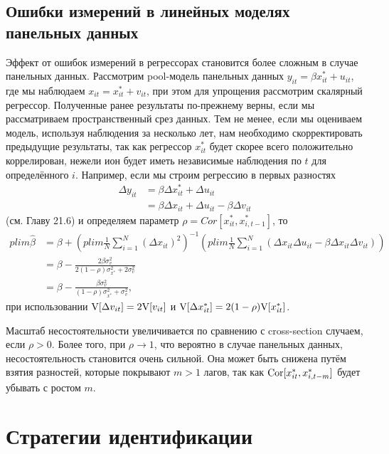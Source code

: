 \subsection{Ошибки измерений в линейных моделях панельных данных}
 
Эффект от ошибок измерений в регрессорах становится более сложным в случае панельных данных.
Рассмотрим pool-модель панельных данных $y_{it}=\beta x^*_{it}+u_{it}$, где мы наблюдаем $x_{it}=x^*_{it}+v_{it}$, при этом для упрощения рассмотрим скалярный регрессор. Полученные ранее результаты по-прежнему верны, если мы рассматриваем пространственный срез данных. Тем не менее, если мы оцениваем модель, используя наблюдения за несколько лет, нам необходимо скорректировать  предыдущие результаты, так как регрессор $x^*_{it}$ будет скорее всего положительно коррелирован, нежели ион будет иметь независимые наблюдения по $t$ для определённого $i$. Например, если мы строим регрессию в первых разностях
\begin{align*}
\Delta y_{it}&=\beta \Delta x^*_{it}+ \Delta u_{it} \\
&= \beta \Delta x_{it}+\Delta u_{it}-\beta \Delta v_{it}
\end{align*}
(см. Главу 21.6) и определяем параметр $\rho = Cor[x^*_{it}, x^*_{i,t-1}]$, то
\begin{align*}
plim\widehat{\beta}&=\beta + \left( plim \frac{1}{N} \sum \limits^{N}_{i=1}(\Delta x_{it})^2 \right)^{-1} \left( plim \frac{1}{N} \sum \limits^{N}_{i=1}(\Delta x_{it} \Delta u_{it}-\beta \Delta x_{it} \Delta v_{it}) \right) \\
&= \beta - \frac{2\beta \sigma^2_v}{2(1-\rho)\sigma^2_{x^*}+2\sigma^2_v} \\
&=\beta-\frac{\beta \sigma^2_v}{(1-\rho)\sigma^2_{x^*}+\sigma^2_v},
\end{align*}
при использовании $\mathrm{V}[\Delta v_{it}]=2\mathrm{V}[v_{it}]$ и $\mathrm{V}[\Delta x^*_{it}]=2(1-\rho)\mathrm{V}[x^*_{it}]$.

Масштаб несостоятельности увеличивается по сравнению с cross-section случаем, если $\rho>0$. Более того, при $\rho\rightarrow 1$, что вероятно в случае панельных данных, несостоятельность становится очень сильной. Она может быть снижена путём взятия разностей, которые покрывают $m>1$ лагов, так как $\mathrm{Cor}[x^*_{it}, x^*_{i,t-m}]$ будет убывать с ростом $m$.

\section{Стратегии идентификации} 

